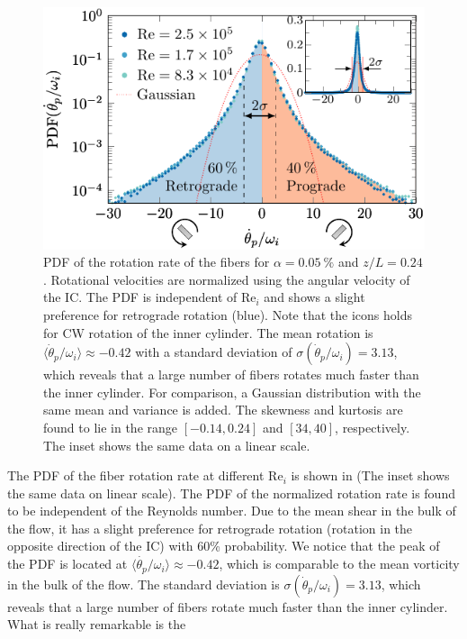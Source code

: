 %
\begin{figure}[htp]
\centering
\includegraphics{figure6bfiberrrate}
\caption{PDF of the rotation rate of the fibers for
$\alpha=\SI{0.05}{\percent}$ and $z/L=0.24$. Rotational velocities are
normalized using the angular velocity of the IC. The PDF is
independent of $\text{Re}_i$ and shows a slight preference for retrograde
rotation (blue). Note that the icons holds for CW rotation of the inner
cylinder.
The mean rotation is $\langle \dot{\theta}_p/\omega_i \rangle \approx -0.42$ with a standard deviation of 
$\sigma(\dot{\theta}_p/\omega_i)=3.13$, which reveals that a large number of 
fibers rotates much faster than the inner cylinder. For comparison, a Gaussian distribution with the same mean and variance is added.
The skewness and kurtosis are found to lie in
the range $[-0.14, 0.24]$ and $[34,40]$, respectively.
The inset shows the same data on a linear scale.%
}%
\label{fig:fiberrotation}%
\end{figure}%
%
The PDF of the fiber rotation rate at different $\text{Re}_i$ is shown in
 (The inset shows the same data on linear scale).
The PDF of the normalized rotation rate is found
to be independent of the Reynolds number.
Due to the mean shear in the bulk of the flow, it has a slight preference for retrograde rotation (rotation in the opposite
direction of the IC) with 60\% probability. We notice
that the peak of the PDF is located at $\langle
\dot{\theta_p}/\omega_i \rangle \approx -0.42$, which is comparable to the
mean vorticity in the bulk of the flow.
The standard deviation is $\sigma(\dot{\theta}_p/\omega_i)=3.13$, which reveals that a large number of fibers rotate much faster than the inner cylinder.
What is really remarkable is the
